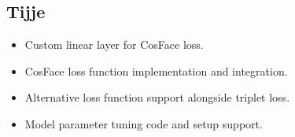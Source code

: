 \subsection*{Tijje}

\begin{itemize}
    \item Custom linear layer for CosFace loss.
    \item CosFace loss function implementation and integration.
    \item Alternative loss function support alongside triplet loss.
    \item Model parameter tuning code and setup support.
\end{itemize}
